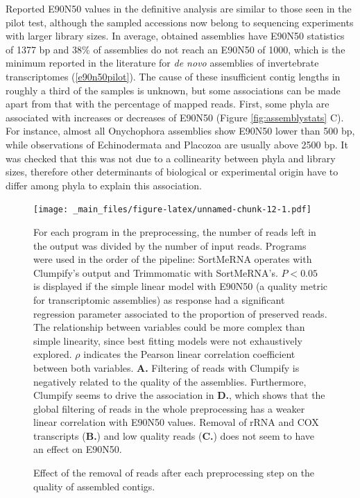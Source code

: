 \documentclass[
  openany]{book}
\begin{document}
Reported E90N50 values in the definitive analysis are similar to those seen in the pilot test, although the sampled accessions now belong to sequencing experiments with larger library sizes. In average, obtained assemblies have E90N50 statistics of 1377 bp and \(38\%\) of assemblies do not reach an E90N50 of 1000, which is the minimum reported in the literature for \emph{de novo} assemblies of invertebrate transcriptomes (\ref{e90n50pilot}). The cause of these insufficient contig lengths in roughly a third of the samples is unknown, but some associations can be made apart from that with the percentage of mapped reads. First, some phyla are associated with increases or decreases of E90N50 (Figure \ref{fig:assemblystats} C). For instance, almost all Onychophora assemblies show E90N50 lower than 500 bp, while observations of Echinodermata and Placozoa are usually above 2500 bp. It was checked that this was not due to a collinearity between phyla and library sizes, therefore other determinants of biological or experimental origin have to differ among phyla to explain this association.

\begin{figure}[!htbp]

\texttt{[image: \_main\_files/figure-latex/unnamed-chunk-12-1.pdf]}

\caption{Effect of the removal of reads after each preprocessing step on the quality of assembled contigs.\label{fig:preprassembly}}
For each program in the preprocessing, the number of reads left in the output was divided by the number of input reads. Programs were used in the order of the pipeline: SortMeRNA operates with Clumpify's output and Trimmomatic with SortMeRNA's. $P < 0.05$ is displayed if the simple linear model with E90N50 (a quality metric for transcriptomic assemblies) as response had a significant regression parameter associated to the proportion of preserved reads. The relationship between variables could be more complex than simple linearity, since best fitting models were not exhaustively explored. $\rho$ indicates the Pearson linear correlation coefficient between both variables. \textbf{A. } Filtering of reads with Clumpify is negatively related to the quality of the assemblies. Furthermore, Clumpify seems to drive the association in \textbf{D.}, which shows that the global filtering of reads in the whole preprocessing has a weaker linear correlation with E90N50 values. Removal of rRNA and COX transcripts (\textbf{B.}) and low quality reads (\textbf{C.}) does not seem to have an effect on E90N50.

\end{figure}
\end{document}
